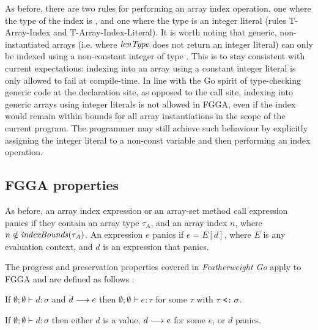 As before, there are two rules for performing an array index operation, one
where the type of the index is , and one where the type is an integer
literal (rules T-Array-Index and T-Array-Index-Literal). It is worth noting that
generic, non-instantiated arrays (i.e. where $\mathit{lenType}$ does not return an
integer literal) can only be indexed using a non-constant integer of type
. This is to stay consistent with current expectations: indexing into an
array using a constant integer literal is only allowed to fail at compile-time.
In line with the Go spirit of type-checking generic code at the declaration
site, as opposed to the call site, indexing into generic arrays using integer
literals is not allowed in FGGA, even if the index would remain within bounds
for all array instantiations in the scope of the current program. The programmer
may still achieve such behaviour by explicitly assigning the integer literal to
a non-const  variable and then performing an index operation.




\subsection{FGGA properties}

As before, an array index expression or an array-set method call expression
panics if they contain an array type $\tau_A$, and an array index $n$, where $n
    \notin \mathit{indexBounds}(\tau_A)$. An expression $e$ panics if $e = E[d]$, where $E$ is
any evaluation context, and $d$ is an expression that panics.

The progress and preservation properties covered in \emph{Featherweight Go}
apply to FGGA and are defined as follows \autocite{fg}:

\begin{theorem}[Preservation]
    If\/ $\emptyset;\emptyset \vdash d : \sigma$ and $d \longrightarrow e$
    then\/ $\emptyset;\emptyset \vdash e : \tau$ for some $\tau$
    with\/ $\tau \mathbin{\texttt{<:}} \sigma$.
\end{theorem}

\begin{theorem}[Progress]
    If\/ $\emptyset;\emptyset \vdash d:\sigma$ then
    either\/ $d$ is a value,
    $d \longrightarrow e$ for some $e$,
    or\/ $d$ panics.
\end{theorem}
